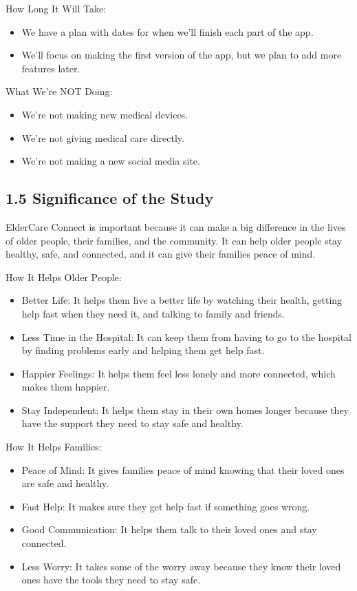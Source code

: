 \documentclass{article}
\begin{document}
How Long It Will Take:

\begin{itemize}
    \item We have a plan with dates for when we'll finish each part of the app.
    \item We'll focus on making the first version of the app, but we plan to add more features later.
\end{itemize}

What We're NOT Doing:

\begin{itemize}
    \item We're not making new medical devices.
    \item We're not giving medical care directly.
    \item We're not making a new social media site.
\end{itemize}

\subsection*{1.5 Significance of the Study}

ElderCare Connect is important because it can make a big difference in the lives of older people, their families, and the community. It can help older people stay healthy, safe, and connected, and it can give their families peace of mind.

How It Helps Older People:

\begin{itemize}
    \item Better Life: It helps them live a better life by watching their health, getting help fast when they need it, and talking to family and friends.
    \item Less Time in the Hospital: It can keep them from having to go to the hospital by finding problems early and helping them get help fast.
    \item Happier Feelings: It helps them feel less lonely and more connected, which makes them happier.
    \item Stay Independent: It helps them stay in their own homes longer because they have the support they need to stay safe and healthy.
\end{itemize}

How It Helps Families:

\begin{itemize}
    \item Peace of Mind: It gives families peace of mind knowing that their loved ones are safe and healthy.
    \item Fast Help: It makes sure they get help fast if something goes wrong.
    \item Good Communication: It helps them talk to their loved ones and stay connected.
    \item Less Worry: It takes some of the worry away because they know their loved ones have the tools they need to stay safe.
\end{itemize}
\end{document}
